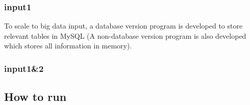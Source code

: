 \documentclass{article}
\begin{document}
\subsubsection{input1}
To scale to big data input, a database version program is developed to store relevant tables in MySQL (A non-database version program is also developed which stores all information in memory).



\subsubsection{input1\&2}




\subsection{How to run}





\end{document}
